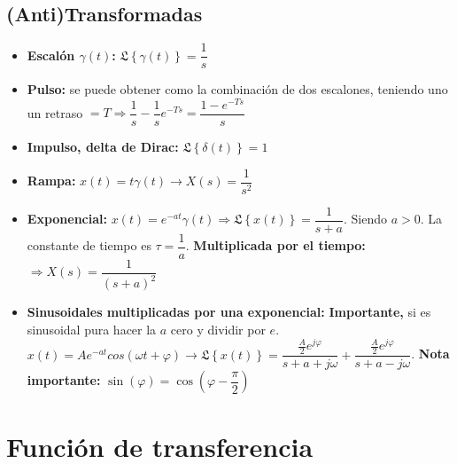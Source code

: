 \documentclass[a4paper, twocolumn, 10pt]{article}
\begin{document}
\subsection{(Anti)Transformadas}

\begin{itemize}
	\item \textbf{Escalón $\gamma(t)$:} $\mathfrak{L}\left\{\gamma(t)\right\} = \dfrac{1}{s}$
	\item \textbf{Pulso:} se puede obtener como la combinación de dos escalones, teniendo uno un retraso $= T \Rightarrow \dfrac{1}{s} - \dfrac{1}{s}e^{-Ts} = \dfrac{1-e^{-Ts}}{s}$
	\item \textbf{Impulso, delta de Dirac:} $\mathfrak{L}\left\{\delta(t)\right\} = 1$
	\item \textbf{Rampa:} $x(t) = t\gamma(t) \rightarrow X(s) = \dfrac{1}{s^2}$
	\item \textbf{Exponencial:} $x(t) = e^{-at}\gamma(t) \Rightarrow \mathfrak{L}\left\{x(t)\right\} = \dfrac{1}{s + a}$. Siendo $a > 0$. La constante de tiempo es $\tau = \dfrac{1}{a}$. \textbf{Multiplicada por el tiempo:} $\Rightarrow X(s) = \dfrac{1}{(s + a)^2}$
	\item \textbf{Sinusoidales multiplicadas por una exponencial:} \textbf{Importante,} si es sinusoidal pura hacer la $a$ cero y dividir por $e$. $x(t) = Ae^{-at}cos(\omega t + \varphi) \rightarrow \mathfrak{L}\left\{x(t)\right\} = \dfrac{\frac{A}{2}e^{j\varphi}}{s + a + j\omega} + \dfrac{\frac{A}{2}e^{j\varphi}}{s + a - j\omega}$. \textbf{Nota importante:} $\sin(\varphi) = \cos\left(\varphi - \dfrac{\pi}{2}\right)$
\end{itemize}

\section{Función de transferencia}
\end{document}
